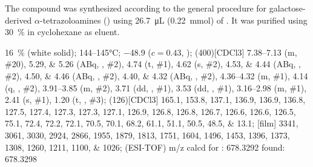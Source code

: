 The compound was synthesized according to the general procedure for galactose-derived $\alpha$-tetrazoloamines () using \SI{26.7}{\micro\liter} (\SI{0.22}{\milli\mol}) of .
It was purified using \SI{30}{\percent}  in cyclohexane as eluent.
\begin{fullexp}
	 \SI{16}{\percent} (white solid); 
	 \numrange{144}{145}\si{\celsius}; 
	\data{[$\alpha^{23}_D$]~$=$} \num{-48.9} ($c = 0.43$, ); 
	\NMR(400)[CDCl3] \numrange{7.38}{7.13} (m, \#{20}), \numlist{5.29;5.26} (ABq, , \#{2}), \num{4.74} (t, \#{1}), \num{4.62} (s, \#{2}), \numlist{4.53;4.44} (ABq, , \#{2}), \numlist{4.50;4.46} (ABq, , \#{2}), \numlist{4.40;4.32} (ABq, , \#{2}), \numrange{4.36}{4.32} (m, \#{1}), \num{4.14} (q, , \#{2}), \numrange{3.91}{3.85} (m, \#{2}), \num{3.71} (dd, , \#{1}), \num{3.53} (dd, , \#{1}), \numrange{3.16}{2.98} (m, \#{1}), \num{2.41} (s, \#{1}), \num{1.20} (t, , \#{3}); 
	(126)[CDCl3] \numlist{165.1; 153.8; 137.1; 136.9; 136.9; 136.8; 127.5; 127.4; 127.3; 127.3; 127.1; 126.9; 126.8; 126.8; 126.7; 126.6; 126.6; 126.5; 75.1; 72.4; 72.2; 72.1; 70.5; 70.1; 68.2; 61.1; 51.1; 50.5; 48.5; 13.1}; 
	[film] \numlist{3341; 3061; 3030; 2924; 2866; 1955; 1879; 1813; 1751; 1604; 1496; 1453; 1396; 1373; 1308; 1260; 1211; 1100; 1026}; 
	 (ESI-TOF) m/z calcd for : \num{678.3292} found: \num{678.3298}
\end{fullexp}

